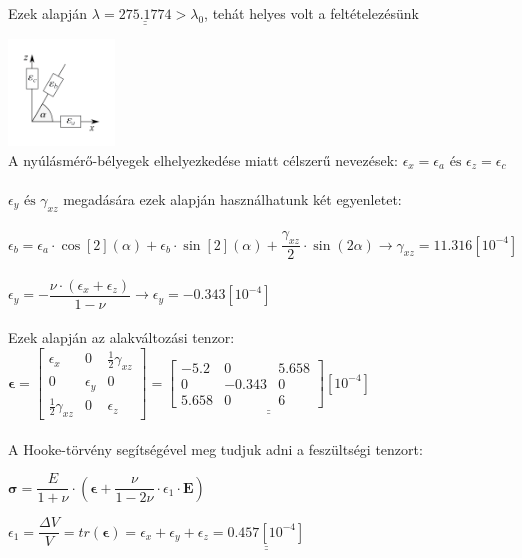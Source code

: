 \documentclass[10pt, a4paper]{article}
\newcommand{\negy}{\begin{trivlist}\item[\hskip \labelsep {\bfseries 
			{4. Feladat:}}]\end{trivlist}}
\newcommand{\minegy}{\mathrm{\left[10^{-4}\right]}}
\begin{document}
	Ezek alapján $\lambda = \underline{\underline{275.1774}} > \lambda_0$, tehát helyes volt a feltételezésünk
	\negy
	\includegraphics[width=80pt]{epsilonabra.png}\\
	A nyúlásmérő-bélyegek elhelyezkedése miatt célszerű nevezések: $\epsilon_x = \epsilon_a \text{ és } \epsilon_z = \epsilon_c$\\\\
	$\epsilon_y \text{ és } \gamma_{xz}$ megadására ezek alapján használhatunk két egyenletet:\\\\
	$\epsilon_b = \epsilon_a \cdot \cos[2](\alpha) + \epsilon_b \cdot \sin[2](\alpha) + \dfrac{\gamma_{xz}}{2} \cdot \sin(2\alpha) \xrightarrow{} \gamma_{xz} = 11.316 \minegy$\\\\
	$\epsilon_y = -\dfrac{\nu \cdot (\epsilon_x + \epsilon_z)}{1 - \nu} \xrightarrow{} \epsilon_y = -0.343 \minegy$\\\\
	Ezek alapján az alakváltozási tenzor: $\boldsymbol{\epsilon} = 
	\begin{bmatrix}
		\epsilon_x & 0 & \frac{1}{2}\gamma_{xz}\\
		0 & \epsilon_y & 0\\
		\frac{1}{2}\gamma_{xz} & 0 & \epsilon_z
	\end{bmatrix} = 
	\underline{\underline{\begin{bmatrix}
	-5.2 & 0 & 5.658\\
	0 & -0.343 & 0\\
	5.658 & 0 & 6
	\end{bmatrix} \minegy}}$\\\\
	A Hooke-törvény segítségével meg tudjuk adni a feszültségi tenzort:
	\begin{center}
		$\boldsymbol{\sigma} = \dfrac{E}{1 + \nu} \cdot \left( \boldsymbol{\epsilon} + \dfrac{\nu}{1 - 2\nu} \cdot \epsilon_1 \cdot \textbf{E} \right)$
	\end{center}
	$\epsilon_1 = \dfrac{\Delta V}{V} = tr(\boldsymbol{\epsilon}) = \epsilon_x + \epsilon_y + \epsilon_z = \underline{\underline{0.457 \minegy}}$\\\\
\end{document}
